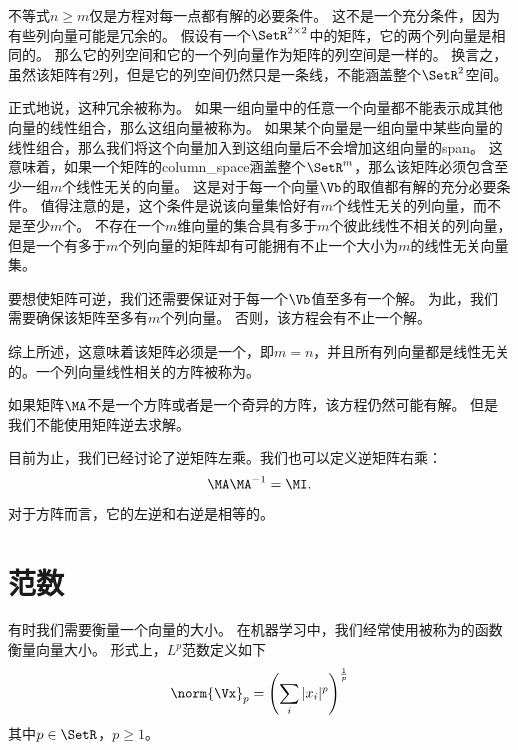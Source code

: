 

不等式$n\geq m$仅是方程对每一点都有解的必要条件。
这不是一个充分条件，因为有些列向量可能是冗余的。
假设有一个$\SetR^{2\times 2}$中的矩阵，它的两个列向量是相同的。
那么它的列空间和它的一个列向量作为矩阵的列空间是一样的。
换言之，虽然该矩阵有$2$列，但是它的列空间仍然只是一条线，不能涵盖整个$\SetR^2$空间。


正式地说，这种冗余被称为。
如果一组向量中的任意一个向量都不能表示成其他向量的线性组合，那么这组向量被称为。
如果某个向量是一组向量中某些向量的线性组合，那么我们将这个向量加入到这组向量后不会增加这组向量的\gls{span}。
这意味着，如果一个矩阵的\gls{column_space}涵盖整个$\SetR^m$，那么该矩阵必须包含至少一组$m$个线性无关的向量。
这是对于每一个向量$\Vb$的取值都有解的充分必要条件。
值得注意的是，这个条件是说该向量集恰好有$m$个线性无关的列向量，而不是至少$m$个。
不存在一个$m$维向量的集合具有多于$m$个彼此线性不相关的列向量，但是一个有多于$m$个列向量的矩阵却有可能拥有不止一个大小为$m$的线性无关向量集。


要想使矩阵可逆，我们还需要保证对于每一个$\Vb$值至多有一个解。
为此，我们需要确保该矩阵至多有$m$个列向量。
否则，该方程会有不止一个解。


综上所述，这意味着该矩阵必须是一个，即$m=n$，并且所有列向量都是线性无关的。一个列向量线性相关的方阵被称为。


如果矩阵$\MA$不是一个方阵或者是一个奇异的方阵，该方程仍然可能有解。
但是我们不能使用矩阵逆去求解。


目前为止，我们已经讨论了逆矩阵左乘。我们也可以定义逆矩阵右乘：
\begin{equation}
\MA\MA^{-1}=\MI.
\end{equation}
对于方阵而言，它的左逆和右逆是相等的。




\section{范数}
\label{sec:norms}

有时我们需要衡量一个向量的大小。
在机器学习中，我们经常使用被称为的函数衡量向量大小。
形式上，$L^p$范数定义如下
\begin{equation}
    \norm{\Vx}_p = \left( \sum_i |x_i|^p \right)^{\frac{1}{p}}
\label{eq:2.30}
\end{equation}
其中$p\in \SetR$，$p\geq 1$。



